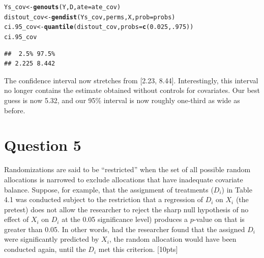 \documentclass[11pt,notitlepage]{article}\usepackage[]{graphicx}\usepackage[]{color}
\makeatletter
\newcommand{\hlnum}[1]{\textcolor[rgb]{0.686,0.059,0.569}{#1}}%
\newcommand{\hlstd}[1]{\textcolor[rgb]{0.345,0.345,0.345}{#1}}%
\newcommand{\hlkwb}[1]{\textcolor[rgb]{0.69,0.353,0.396}{#1}}%
\newcommand{\hlkwc}[1]{\textcolor[rgb]{0.333,0.667,0.333}{#1}}%
\newcommand{\hlkwd}[1]{\textcolor[rgb]{0.737,0.353,0.396}{\textbf{#1}}}%
\newenvironment{kframe}{%
 \def\at@end@of@kframe{}%
 \ifinner\ifhmode%
  \def\at@end@of@kframe{\end{minipage}}%
  \begin{minipage}{\columnwidth}%
 \fi\fi%
 \def\FrameCommand##1{\hskip\@totalleftmargin \hskip-\fboxsep
 \colorbox{shadecolor}{##1}\hskip-\fboxsep
     \hskip-\linewidth \hskip-\@totalleftmargin \hskip\columnwidth}%
 \MakeFramed {\advance\hsize-\width
   \@totalleftmargin\z@ \linewidth\hsize
   \@setminipage}}%
 {\par\unskip\endMakeFramed%
 \at@end@of@kframe}
\newenvironment{knitrout}{}{} %
\makeatother
\begin{document}
\begin{enumerate}[a)]
\begin{knitrout}
\color{fgcolor}\begin{kframe}
\begin{alltt}
\hlstd{Ys_cov} \hlkwb{<-} \hlkwd{genouts}\hlstd{(Y,D,}\hlkwc{ate}\hlstd{=ate_cov)}
\hlstd{distout_cov} \hlkwb{<-} \hlkwd{gendist}\hlstd{(Ys_cov,perms,X,}\hlkwc{prob}\hlstd{=probs)}
\hlstd{ci.95_cov} \hlkwb{<-} \hlkwd{quantile}\hlstd{(distout_cov,} \hlkwc{probs}\hlstd{=}\hlkwd{c}\hlstd{(}\hlnum{0.025}\hlstd{,} \hlnum{.975}\hlstd{))}
\hlstd{ci.95_cov}
\end{alltt}
\begin{verbatim}
##  2.5% 97.5% 
## 2.225 8.442
\end{verbatim}
\end{kframe}
\end{knitrout}

The confidence interval now stretches from [2.23, 8.44].  Interestingly, this interval no longer contains the estimate obtained without controls for covariates.  Our best guess is now 5.32, and our 95\% interval is now roughly one-third as wide as before.

\end{enumerate}

\section*{Question 5}


Randomizations are said to be ``restricted'' when the set of all possible random allocations is narrowed to exclude allocations that have inadequate covariate balance.  Suppose, for example, that the assignment of treatments ($D_i$) in Table 4.1 was conducted subject to the restriction that a regression of $D_i$ on $X_i$ (the pretest) does not allow the researcher to reject the sharp null hypothesis of no effect of $X_i$ on $D_i$ at the 0.05 significance level) produces a $p$-value on that is greater than 0.05. In other words, had the researcher found that the assigned $D_i$ were significantly predicted by $X_i$, the random allocation would have been conducted again, until the $D_i$ met this criterion. [10pts]
\end{document}
